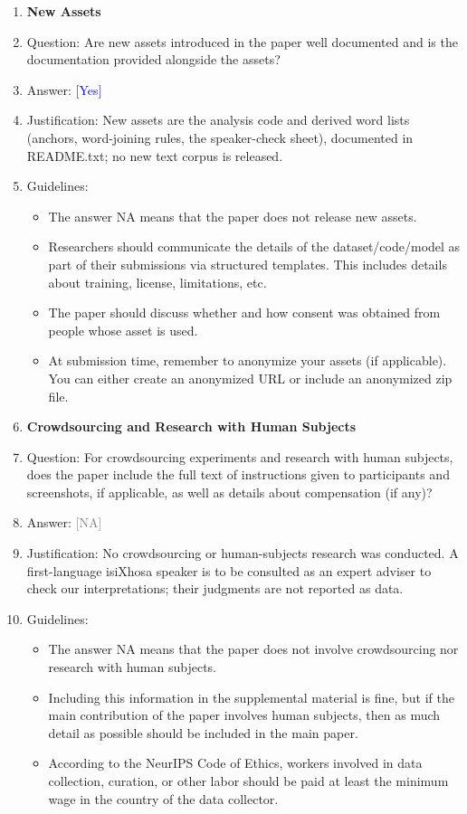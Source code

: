 \documentclass[10pt,letterpaper]{article}
\newcommand{\answerYes}[1][]{\textcolor{blue}{[Yes] #1}}
\newcommand{\answerNA}[1][]{\textcolor{gray}{[NA] #1}}
\begin{document}
\begin{enumerate}
\item {\bf New Assets}
    \item[] Question: Are new assets introduced in the paper well documented and is the documentation provided alongside the assets?
    \item[] Answer: \answerYes{}
    \item[] Justification: New assets are the analysis code and derived word lists (anchors, word-joining rules, the speaker-check sheet), documented in README.txt; no new text corpus is released.
    \item[] Guidelines:
    \begin{itemize}
        \item The answer NA means that the paper does not release new assets.
        \item Researchers should communicate the details of the dataset/code/model as part of their submissions via structured templates. This includes details about training, license, limitations, etc. 
        \item The paper should discuss whether and how consent was obtained from people whose asset is used.
        \item At submission time, remember to anonymize your assets (if applicable). You can either create an anonymized URL or include an anonymized zip file.
    \end{itemize}

\item {\bf Crowdsourcing and Research with Human Subjects}
    \item[] Question: For crowdsourcing experiments and research with human subjects, does the paper include the full text of instructions given to participants and screenshots, if applicable, as well as details about compensation (if any)? 
    \item[] Answer: \answerNA{}
    \item[] Justification: No crowdsourcing or human-subjects research was conducted. A first-language isiXhosa speaker is to be consulted as an expert adviser to check our interpretations; their judgments are not reported as data.
    \item[] Guidelines:
    \begin{itemize}
        \item The answer NA means that the paper does not involve crowdsourcing nor research with human subjects.
        \item Including this information in the supplemental material is fine, but if the main contribution of the paper involves human subjects, then as much detail as possible should be included in the main paper. 
        \item According to the NeurIPS Code of Ethics, workers involved in data collection, curation, or other labor should be paid at least the minimum wage in the country of the data collector. 
    \end{itemize}


\end{enumerate}
\end{document}
